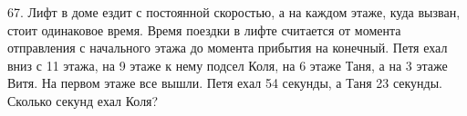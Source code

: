 67. Лифт в доме ездит с постоянной скоростью, а на каждом этаже, куда вызван, стоит одинаковое время. Время поездки в лифте считается от момента отправления с начального этажа до момента прибытия на конечный. Петя ехал вниз с 11 этажа, на 9 этаже к нему подсел Коля, на 6 этаже Таня, а на 3 этаже Витя. На первом этаже все вышли. Петя ехал 54 секунды, а Таня 23 секунды. Сколько секунд ехал Коля?\\
